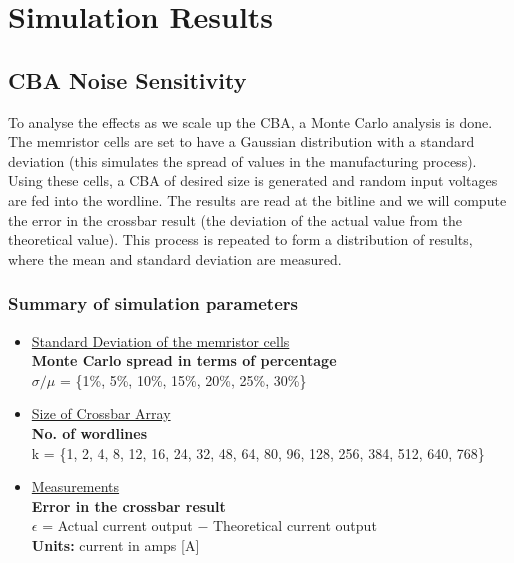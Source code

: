 
\chapter{Simulation Results}
\label{appendix:simulation_results}

\vspace{2em}

\section{\Ac{CBA} Noise Sensitivity}
\label{appendix:simulation_results:cba_ns}

\noindent
To analyse the effects as we scale up the \ac{CBA}, a Monte Carlo analysis is done.
The memristor cells are set to have a Gaussian distribution with a standard deviation (this simulates the spread of values in the manufacturing process).
Using these cells, a \ac{CBA} of desired size is generated and random input voltages are fed into the wordline.
The results are read at the bitline and we will compute the error in the crossbar result (the deviation of the actual value from the theoretical value). This process is repeated to form a distribution of results, where the mean and standard deviation are measured.

\subsection{Summary of simulation parameters}

\begin{itemize}
    \item \underline{Standard Deviation of the memristor cells}\\
        \textbf{Monte Carlo spread in terms of percentage} \\
            ${\sigma / \mu}$ = \{1\%,  5\%, 10\%, 15\%, 20\%, 25\%, 30\%\}
    \item \underline{Size of Crossbar Array} \\
        \textbf{No. of wordlines} \\
        k = \{1, 2, 4, 8, 12, 16, 24, 32, 48, 64, 80, 96, 128, 256, 384, 512, 640, 768\}
    \item \underline{Measurements} \\
        \textbf{Error in the crossbar result} \\
        $\epsilon$ = Actual current output $-$ Theoretical current output \\
        \textbf{Units:} {current in amps [A]}
\end{itemize}


